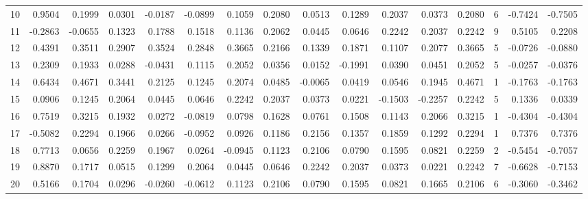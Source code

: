 \begin{tabular}{lrrrrrrrrrrrrrrr}
10  &      0.9504 &  0.1999 &  0.0301 & -0.0187 & -0.0899 &  0.1059 &  0.2080 &  0.0513 &  0.1289 &  0.2037 &   0.0373 &     0.2080 &      6 &                   -0.7424 &                    -0.7505 \\
11  &     -0.2863 & -0.0655 &  0.1323 &  0.1788 &  0.1518 &  0.1136 &  0.2062 &  0.0445 &  0.0646 &  0.2242 &   0.2037 &     0.2242 &      9 &                    0.5105 &                     0.2208 \\
12  &      0.4391 &  0.3511 &  0.2907 &  0.3524 &  0.2848 &  0.3665 &  0.2166 &  0.1339 &  0.1871 &  0.1107 &   0.2077 &     0.3665 &      5 &                   -0.0726 &                    -0.0880 \\
13  &      0.2309 &  0.1933 &  0.0288 & -0.0431 &  0.1115 &  0.2052 &  0.0356 &  0.0152 & -0.1991 &  0.0390 &   0.0451 &     0.2052 &      5 &                   -0.0257 &                    -0.0376 \\
14  &      0.6434 &  0.4671 &  0.3441 &  0.2125 &  0.1245 &  0.2074 &  0.0485 & -0.0065 &  0.0419 &  0.0546 &   0.1945 &     0.4671 &      1 &                   -0.1763 &                    -0.1763 \\
15  &      0.0906 &  0.1245 &  0.2064 &  0.0445 &  0.0646 &  0.2242 &  0.2037 &  0.0373 &  0.0221 & -0.1503 &  -0.2257 &     0.2242 &      5 &                    0.1336 &                     0.0339 \\
16  &      0.7519 &  0.3215 &  0.1932 &  0.0272 & -0.0819 &  0.0798 &  0.1628 &  0.0761 &  0.1508 &  0.1143 &   0.2066 &     0.3215 &      1 &                   -0.4304 &                    -0.4304 \\
17  &     -0.5082 &  0.2294 &  0.1966 &  0.0266 & -0.0952 &  0.0926 &  0.1186 &  0.2156 &  0.1357 &  0.1859 &   0.1292 &     0.2294 &      1 &                    0.7376 &                     0.7376 \\
18  &      0.7713 &  0.0656 &  0.2259 &  0.1967 &  0.0264 & -0.0945 &  0.1123 &  0.2106 &  0.0790 &  0.1595 &   0.0821 &     0.2259 &      2 &                   -0.5454 &                    -0.7057 \\
19  &      0.8870 &  0.1717 &  0.0515 &  0.1299 &  0.2064 &  0.0445 &  0.0646 &  0.2242 &  0.2037 &  0.0373 &   0.0221 &     0.2242 &      7 &                   -0.6628 &                    -0.7153 \\
20  &      0.5166 &  0.1704 &  0.0296 & -0.0260 & -0.0612 &  0.1123 &  0.2106 &  0.0790 &  0.1595 &  0.0821 &   0.1665 &     0.2106 &      6 &                   -0.3060 &                    -0.3462 \\

\end{tabular}
